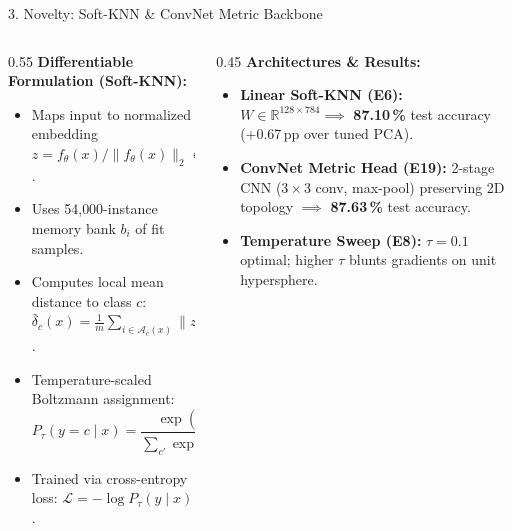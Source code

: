 \documentclass[aspectratio=169,11pt]{beamer}
\begin{document}
\begin{frame}{3. Novelty: Soft-KNN \& ConvNet Metric Backbone}
\begin{columns}
\begin{column}{0.55\textwidth}
\textbf{Differentiable Formulation (Soft-KNN):}
\begin{itemize}
  \item Maps input to normalized embedding $z = f_\theta(x) / \|f_\theta(x)\|_2 \in \mathbb{S}^{127}$.
  \item Uses 54{,}000-instance memory bank $b_i$ of fit samples.
  \item Computes local mean distance to class $c$: $\bar\delta_c(x) = \frac{1}{m}\sum_{i \in \mathcal{A}_c(x)} \|z - b_i\|_2$.
  \item Temperature-scaled Boltzmann assignment:
  \[
    P_\tau(y = c \mid x) = \frac{\exp(-\bar\delta_c(x)/\tau)}{\sum_{c'} \exp(-\bar\delta_{c'}(x)/\tau)}
  \]
  \item Trained via cross-entropy loss: $\mathcal{L} = -\log P_\tau(y \mid x)$.
\end{itemize}
\end{column}

\begin{column}{0.45\textwidth}
\textbf{Architectures \& Results:}
\begin{itemize}
  \item \textbf{Linear Soft-KNN (E6):} $W \in \mathbb{R}^{128\times 784} \implies$ \textbf{87.10\,\%} test accuracy (+0.67\,pp over tuned PCA).
  \item \textbf{ConvNet Metric Head (E19):} 2-stage CNN ($3\times3$ conv, max-pool) preserving 2D topology $\implies$ \textbf{87.63\,\%} test accuracy.
  \item \textbf{Temperature Sweep (E8):} $\tau=0.1$ optimal; higher $\tau$ blunts gradients on unit hypersphere.
\end{itemize}
\end{column}
\end{columns}
\end{frame}
\end{document}
